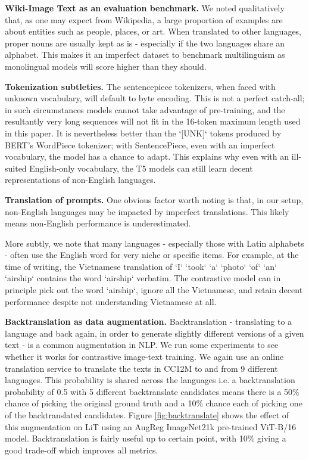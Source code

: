\documentclass[10pt,twocolumn,letterpaper]{article}
\def \lit {LiT\xspace}
\begin{document}
\textbf{Wiki-Image Text as an evaluation benchmark.} We noted qualitatively that, as one may expect from Wikipedia, a large proportion of examples are about entities such as people, places, or art. When translated to other languages, proper nouns are usually kept as is - especially if the two languages share an alphabet. This makes it an imperfect dataset to benchmark multilinguism as monolingual models will score higher than they should.

\textbf{Tokenization subtleties.} The sentencepiece tokenizers, when faced with unknown vocabulary, will default to byte encoding. This is not a perfect catch-all; in such circumstances models cannot take advantage of pre-training, and the resultantly very long sequences will not fit in the 16-token maximum length used in this paper. It is nevertheless better than the `[UNK]` tokens produced by BERT's WordPiece tokenizer; with SentencePiece, even with an imperfect vocabulary, the model has a chance to adapt. This explains why even with an ill-suited English-only vocabulary, the T5 models can still learn decent representations of non-English languages.

\textbf{Translation of prompts.} One obvious factor worth noting is that, in our setup, non-English languages may be impacted by imperfect translations. This likely means non-English performance is underestimated.

More subtly, we note that many languages - especially those with Latin alphabets - often use the English word for very niche or specific items. For example, at the time of writing, the Vietnamese translation of `I` `took` `a` `photo` `of` `an` `airship` contains the word `airship` verbatim. The contrastive model can in principle pick out the word `airship`, ignore all the Vietnamese, and retain decent performance despite not understanding Vietnamese at all.

\textbf{Backtranslation as data augmentation.}
Backtranslation\cite{backtranslate} - translating to a language and back again, in order to generate slightly different versions of a given text - is a common augmentation in NLP. We run some experiments to see whether it works for contrastive image-text training.
We again use an online translation service to translate the texts in CC12M to and from 9 different languages. This probability is shared across the languages i.e. a backtranslation probability of 0.5 with 5 different backtranslate candidates means there is a 50\% chance of picking the original ground truth and a 10\% chance each of picking one of the backtranslated candidates.
Figure \ref{fig:backtranslate} shows the effect of this augmentation on \lit{} using an AugReg ImageNet21k pre-trained ViT-B/16 model. Backtranslation is fairly useful up to certain point, with 10\% giving a good trade-off which improves all metrics.
\end{document}
